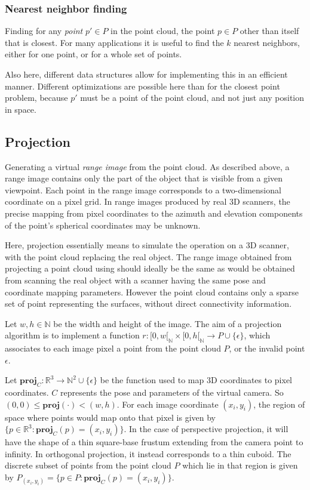 \subsubsection{Nearest neighbor finding}
Finding for any \emph{point} $p' \in P$ in the point cloud, the point $p \in P$ other than itself that is closest. For many applications it is useful to find the $k$ nearest neighbors, either for one point, or for a whole set of points.

Also here, different data structures allow for implementing this in an efficient manner. Different optimizations are possible here than for the closest point problem, because $p'$ must be a point of the point cloud, and not just any position in space.


\subsection{Projection}
Generating a virtual \emph{range image} from the point cloud. As described above, a range image contains only the part of the object that is visible from a given viewpoint. Each point in the range image corresponds to a two-dimensional coordinate on a pixel grid. In range images produced by real 3D scanners, the precise mapping from pixel coordinates to the azimuth and elevation components of the point's spherical coordinates may be unknown.

Here, projection essentially means to simulate the operation on a 3D scanner, with the point cloud replacing the real object. The range image obtained from projecting a point cloud using should ideally be the same as would be obtained from scanning the real object with a scanner having the same pose and coordinate mapping parameters. However the point cloud contains only a sparse set of point representing the surfaces, without direct connectivity information.

Let $w, h \in \mathbb{N}$ be the width and height of the image. The aim of a projection algorithm is to implement a function $r : [0, w[_{\mathbb{N}} \times [0, h[_{\mathbb{N}} \rightarrow P \cup \{ \epsilon \}$, which associates to each image pixel a point from the point cloud $P$, or the invalid point $\epsilon$. 

Let $\mathbf{proj}_{C} : \mathbb{R}^3 \rightarrow \mathbb{N}^2 \cup \{ \epsilon \}$ be the function used to map 3D coordinates to pixel coordinates. $C$ represents the pose and parameters of the virtual camera. So $(0, 0) \leq \mathbf{proj}(\cdot) < (w, h)$. For each image coordinate $(x_i, y_i)$, the region of space where points would map onto that pixel is given by $\{ p \in \mathbb{R}^3 : \mathbf{proj}_{C}(p) = (x_i, y_i) \}$. In the case of perspective projection, it will have the shape of a thin square-base frustum extending from the camera point to infinity. In orthogonal projection, it instead corresponds to a thin cuboid. The discrete subset of points from the point cloud $P$ which lie in that region is given by $P_{(x_i,y_i)} = \{ p \in P : \mathbf{proj}_{C}(p) = (x_i, y_i) \}$.

